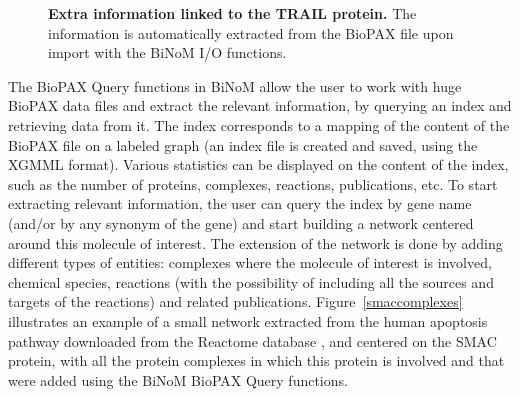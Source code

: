 \documentclass[10pt]{bmc_article}
\newenvironment{bmcformat}{\baselineskip20pt\sloppy\setboolean{publ}{false}}{\baselineskip20pt\sloppy}
\begin{document}
\begin{bmcformat}
\begin{figure}[h]
 \caption{\label{biopaxtrailprop}  \textbf{Extra information linked to the TRAIL protein.}
      The information is automatically extracted from the BioPAX file upon
import with the BiNoM I/O functions.}
\end{figure}


The BioPAX Query functions in BiNoM allow the user to work with huge
BioPAX data files and extract the relevant information, by querying an index and
retrieving data from it. The index corresponds to a mapping of the content of
the BioPAX file on a labeled graph (an index file is created and saved, using
the XGMML format). Various statistics can be displayed on the content of the
index, such as the number of proteins, complexes, reactions, publications, etc.
To start extracting relevant information, the user can query the index by gene
name (and/or by any synonym of the gene) and start building a network centered
around this molecule of interest. The extension of the network is done by adding
different types of entities: complexes where the molecule of interest is
involved, chemical species, reactions (with the possibility of including all the
sources and targets of the reactions) and related publications. Figure~\ref{smaccomplexes}
illustrates an example of a small network extracted from the human apoptosis
pathway downloaded from the Reactome database \cite{joshi2005reactome}, and
centered on the SMAC protein, with all the protein complexes in which
this protein is involved and that were added using the BiNoM BioPAX Query functions.


\end{bmcformat}
\end{document}
